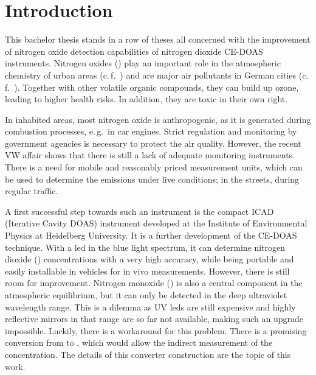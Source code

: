 \section{Introduction}
\label{sec:intro}

This bachelor thesis stands in a row of theses all concerned with the
improvement of nitrogen oxide detection capabilities of nitrogen
dioxide CE-DOAS instruments. Nitrogen oxides () play an
important role in the atmospheric chemistry of urban areas
(c.\,f.~\cite{roedel}) and are major air pollutants in German cities
(c.\,f.~\cite{no2schadstoff,who}). Together with other volatile
organic compounds, they can build up ozone, leading to higher health
risks. In addition, they are toxic in their own right.

In inhabited areas, most nitrogen oxide is anthropogenic, as it is
generated during combustion processes, e.\,g.\ in car engines. Strict
regulation and monitoring by government agencies is necessary to
protect the air quality. However, the recent VW affair shows that
there is still a lack of adequate monitoring instruments. There is a
need for mobile and reasonably priced measurement units, which can be
used to determine the  emissions under live conditions; in
the streets, during regular traffic.

A first successful step towards such an instrument is the compact
 ICAD (Iterative Cavity DOAS) instrument developed at the
Institute of Environmental Physics at Heidelberg University. It is a
further development of the CE-DOAS technique. With a led in the blue
light spectrum, it can determine nitrogen dioxide ()
concentrations with a very high accuracy, while being portable and
easily installable in vehicles for in vivo measurements. However,
there is still room for improvement. Nitrogen monoxide () is
also a central component in the atmospheric  equilibrium, but
it can only be detected in the deep ultraviolet wavelength range. This
is a dilemma as UV leds are still expensive and highly reflective
mirrors in that range are so far not available, making such an upgrade
impossible. Luckily, there is a workaround for this problem. There is
a promising conversion from  to , which would allow the
indirect measurement of the concentration. The details of this
converter construction are the topic of this work.

